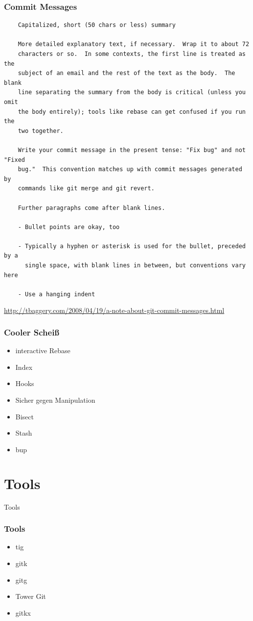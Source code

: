 \documentclass[]{beamer}
\begin{document}
\begin{frame}[fragile]
	\frametitle{Commit Messages}
	\fontsize{8}{8}\selectfont
	\begin{verbatim}
	Capitalized, short (50 chars or less) summary

	More detailed explanatory text, if necessary.  Wrap it to about 72
	characters or so.  In some contexts, the first line is treated as the
	subject of an email and the rest of the text as the body.  The blank
	line separating the summary from the body is critical (unless you omit
	the body entirely); tools like rebase can get confused if you run the
	two together.

	Write your commit message in the present tense: "Fix bug" and not "Fixed
	bug."  This convention matches up with commit messages generated by
	commands like git merge and git revert.

	Further paragraphs come after blank lines.

	- Bullet points are okay, too

	- Typically a hyphen or asterisk is used for the bullet, preceded by a
	  single space, with blank lines in between, but conventions vary here

	- Use a hanging indent
	\end{verbatim}
	\url{http://tbaggery.com/2008/04/19/a-note-about-git-commit-messages.html}
\end{frame}

\begin{frame}
	\frametitle{Cooler Scheiß\texttrademark}
	\begin{itemize}
		\item
			interactive Rebase
		\item
			Index
		\item
			Hooks
		\item
			Sicher gegen Manipulation
		\item
			Bisect
		\item
			Stash
		\item
			bup
	\end{itemize}
\end{frame}

\section{Tools}
\begin{frame}
	\fontsize{30}{10}\selectfont Tools
\end{frame}

\begin{frame}
	\frametitle{Tools}
	\begin{itemize}
		\item
			tig
		\item
			gitk
		\item
			gitg
		\item
			Tower Git
		\item
			gitkx
	\end{itemize}
\end{frame}
\end{document}
